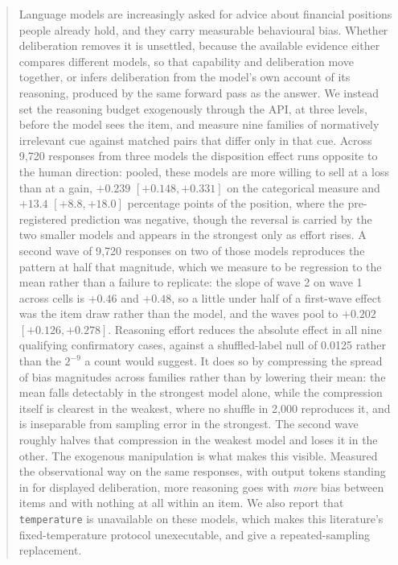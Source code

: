 \begin{abstract}
Language models are increasingly asked for advice about financial positions
people already hold, and they carry measurable behavioural bias. Whether
deliberation removes it is unsettled, because the available evidence either
compares different models, so that capability and deliberation move together,
or infers deliberation from the model's own account of its reasoning,
produced by the same forward pass as the answer. We instead set the
reasoning budget exogenously through the API, at three levels, before the
model sees the item, and measure nine families of normatively irrelevant cue
against matched pairs that differ only in that cue. Across 9{,}720 responses
from three models the disposition effect runs opposite to the human
direction: pooled, these models are more willing to sell at a loss than at a
gain, $+0.239$ $[+0.148, +0.331]$ on the categorical measure and $+13.4$
$[+8.8, +18.0]$ percentage points of the position, where the pre-registered
prediction was negative, though the reversal is carried by the two smaller
models and appears in the strongest only as effort rises. A second wave of
9{,}720 responses on two of those models reproduces the pattern at half that
magnitude, which we measure to be regression to the mean rather than a
failure to replicate: the slope of wave 2 on wave 1 across cells is $+0.46$
and $+0.48$, so a little under half of a first-wave effect was the item draw
rather than the model, and the waves pool to $+0.202$ $[+0.126, +0.278]$. Reasoning effort reduces the absolute effect in all
nine qualifying confirmatory cases, against a shuffled-label null of 0.0125
rather than the $2^{-9}$ a count would suggest. It does so by compressing the
spread of bias magnitudes across families rather than by lowering their mean:
the mean falls detectably in the strongest model alone, while the compression
itself is clearest in the weakest, where no shuffle in 2{,}000 reproduces it,
and is inseparable from sampling error in the strongest. The second wave
roughly halves that compression in the weakest model and loses it in the
other. The exogenous manipulation is what makes this
visible. Measured the observational way on the same responses, with output
tokens standing in for displayed deliberation, more reasoning goes with
\textit{more} bias between items and with nothing at all within an item. We
also report that \texttt{temperature} is unavailable on these models, which
makes this literature's fixed-temperature protocol unexecutable, and give a
repeated-sampling replacement.
\end{abstract}

